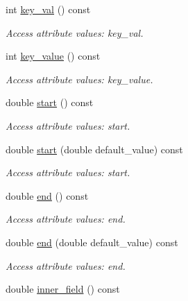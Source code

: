 \begin{DoxyCompactItemize}
int \hyperlink{struct_d_d4hep_1_1_x_m_l_1_1_dimension_a9f85c189d186a7504765f0ae4865db7e}{key\_\-val} () const 
\begin{DoxyCompactList}\small\item\em Access attribute values: key\_\-val. \item\end{DoxyCompactList}\item 
int \hyperlink{struct_d_d4hep_1_1_x_m_l_1_1_dimension_a929488cb315a9c06e64fea6c236e5b7d}{key\_\-value} () const 
\begin{DoxyCompactList}\small\item\em Access attribute values: key\_\-value. \item\end{DoxyCompactList}\item 
double \hyperlink{struct_d_d4hep_1_1_x_m_l_1_1_dimension_a78ee4ef68b16aed998894ef370e9a45e}{start} () const 
\begin{DoxyCompactList}\small\item\em Access attribute values: start. \item\end{DoxyCompactList}\item 
double \hyperlink{struct_d_d4hep_1_1_x_m_l_1_1_dimension_ab9ac0dc372ba761ca855ac91063d1c00}{start} (double default\_\-value) const 
\begin{DoxyCompactList}\small\item\em Access attribute values: start. \item\end{DoxyCompactList}\item 
double \hyperlink{struct_d_d4hep_1_1_x_m_l_1_1_dimension_a7c7b894e88525a4348f1130f9e1617d1}{end} () const 
\begin{DoxyCompactList}\small\item\em Access attribute values: end. \item\end{DoxyCompactList}\item 
double \hyperlink{struct_d_d4hep_1_1_x_m_l_1_1_dimension_a7629361b8d14c63f2a23513826ad122b}{end} (double default\_\-value) const 
\begin{DoxyCompactList}\small\item\em Access attribute values: end. \item\end{DoxyCompactList}\item 
double \hyperlink{struct_d_d4hep_1_1_x_m_l_1_1_dimension_a9cefbb357a8a10ac57d833a776514f39}{inner\_\-field} () const 

\end{DoxyCompactItemize}
